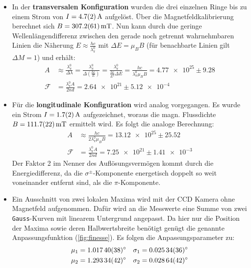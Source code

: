\begin{itemize}
    \item In der \textbf{transversalen Konfiguration} wurden die drei einzelnen Ringe bis zu einem Strom von $I = \SI{4.7\pm 0.2}{\ampere}$ aufgelöst. Über die Magnetfeldkalibrierung berechnet sich $B = \SI{307.2\pm 6.1}{\milli\tesla}$. Nun kann durch due geringe Wellenlängendifferenz zwischen den gerade noch getrennt wahrnehmbaren Linien die Näherung $E \approx \frac{hc}{\lambda_{\pi}^0}$ mit $\Delta E = \mu_B B$ (für benachbarte Linien gilt $\Delta M = 1$) und erhält:
        \begin{align*}
            A &\approx \frac{\lambda_{\pi}^0}{\Delta \lambda} 
                = \frac{\lambda_{\pi}^0}{\Delta \left(\frac{hc}{E}\right)}
                =  \frac{\lambda_{\pi}^0}{\frac{hc}{E^2}\Delta E}
                = \frac{hc}{\lambda_{\pi}^0\mu_B B} = \num{4.77e25} \pm 9.28\\
            \mathcal{F} &= \frac{\lambda_{\pi}^0 A}{2nd} = \num{2.64e21} \pm \num{5.12e-4}
        \end{align*}
    \item Für die \textbf{longitudinale Konfiguration} wird analog vorgegangen. Es wurde ein Strom $I = \SI{1.7\pm 0.2}{\ampere}$ aufgezeichnet, woraus die magn. Flussdichte $B = \SI{111.7\pm 2.2}{\milli\tesla}$ ermittelt wird. Es folgt die analoge Berechnung:
        \begin{align*}
            A &\approx \frac{hc}{2\lambda_{\pi}^0\mu_B B} = \num{13.12e25} \pm \num{25.52}\\
            \mathcal{F} &= \frac{\lambda_{\pi}^0 A}{2nd} = \num{7.25e21} \pm \num{1.41e-3}
        \end{align*}
    Der Faktor 2 im Nenner des Auflösungsvermögen kommt durch die Energiedifferenz, da die $\sigma^{\pm}$-Komponente energetisch doppelt so weit voneinander entfernt sind, als die $\pi$-Komponente.
    \item Ein Ausschnitt von zwei lokalen Maxima wird mit der CCD Kamera ohne Magnetfeld aufgenommen. Dafür wird an die Messwerte eine Summe von zwei \texttt{Gauss}-Kurven mit linearem Untergrund angepasst. Da hier nur die Position der Maxima sowie deren Halbwertsbreite benötigt genügt die genannte Anpassungsfunktion (\cref{fig:finesse}). Es folgen die Anpassungsparameter zu:
    \begin{align*}
        \mu_1 &= \SI{1.01740\pm 0.00038}{\degree} & \sigma_1 &= \SI{0.02534 \pm 0.00036}{\degree}\\
        \mu_2 &= \SI{1.29334\pm 0.00042}{\degree} & \sigma_2 &= \SI{0.02864 \pm 0.00042}{\degree}

\end{align*}
\end{itemize}
